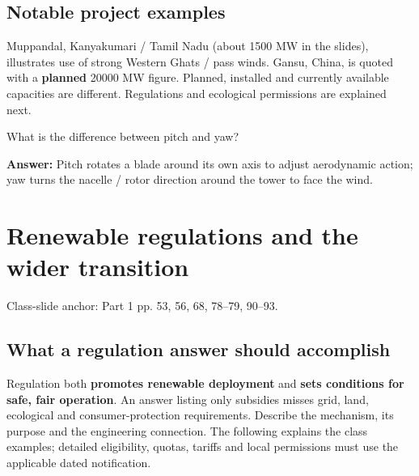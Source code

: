 \documentclass[11pt,a4paper]{article}
\newcommand{\slides}[1]{{\small\color{muted}\textsf{Class-slide anchor: #1.}}\par}
\newcommand{\chapterstart}[2]{\clearpage\section{#1}\label{#2}}
\newcommand{\checkq}[2]{\begin{tcolorbox}[breakable=false,colback=pale,colframe=teal,coltitle=white,title={Check your understanding}]#1\par\textbf{Answer:} #2\end{tcolorbox}}
\begin{document}
\subsection{Notable project examples}
Muppandal, Kanyakumari / Tamil Nadu (about 1500 MW in the slides), illustrates use of strong Western Ghats / pass winds. Gansu, China, is quoted with a \textbf{planned} 20000 MW figure. Planned, installed and currently available capacities are different. Regulations and ecological permissions are explained next.
\checkq{What is the difference between pitch and yaw?}{Pitch rotates a blade around its own axis to adjust aerodynamic action; yaw turns the nacelle / rotor direction around the tower to face the wind.}

\chapterstart{Renewable regulations and the wider transition}{policy}
\slides{Part 1 pp. 53, 56, 68, 78--79, 90--93}
\subsection{What a regulation answer should accomplish}
Regulation both \textbf{promotes renewable deployment} and \textbf{sets conditions for safe, fair operation}. An answer listing only subsidies misses grid, land, ecological and consumer-protection requirements. Describe the mechanism, its purpose and the engineering connection. The following explains the class examples; detailed eligibility, quotas, tariffs and local permissions must use the applicable dated notification.
\end{document}
